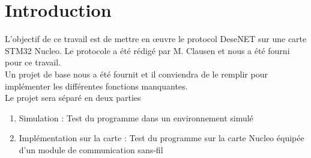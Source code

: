 \documentclass[DeseNET_Sebastien_Deriaz]{subfiles}
\begin{document}
\section{Introduction}
L'objectif de ce travail est de mettre en œuvre le protocol DeseNET sur une carte STM32 Nucleo. Le protocole a été rédigé par M. Clausen et nous a été fourni pour ce travail.\\
Un projet de base nous a été fournit et il conviendra de le remplir pour implémenter les différentes fonctions manquantes.\\
Le projet sera séparé en deux parties
\begin{enumerate}
\item Simulation : Test du programme dans un environnement simulé
\item Implémentation sur la carte : Test du programme sur la carte Nucleo équipée d'un module de communication sans-fil
\end{enumerate}
\end{document}
